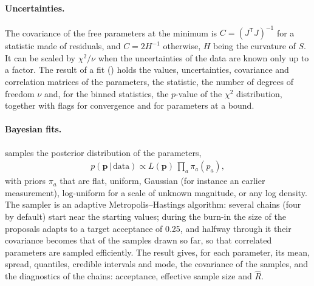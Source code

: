 \paragraph{Uncertainties.}
The covariance of the free parameters at the minimum is $C = (J^{\mathsf{T}}J)^{-1}$ for a statistic made of residuals,
and $C = 2H^{-1}$ otherwise, $H$ being the curvature of $S$. It can be scaled by $\chi^2/\nu$ when the uncertainties
of the data are known only up to a factor. The result of a fit () holds the values, uncertainties,
covariance and correlation matrices of the parameters, the statistic, the number of degrees of freedom $\nu$ and,
for the binned statistics, the $p$-value of the $\chi^2$ distribution, together with flags for convergence and for
parameters at a bound.

\paragraph{Bayesian fits.}
 samples the posterior distribution of the parameters,
\begin{align}
  p(\mathbf{p}\,|\,\text{data}) \propto L(\mathbf{p})\,\prod_a \pi_a(p_a),
\end{align}
with priors $\pi_a$ that are flat, uniform, Gaussian (for instance an earlier
measurement), log-uniform for a scale of unknown magnitude, or any log density. The sampler is an adaptive
Metropolis--Hastings algorithm: several chains (four by default) start near the starting values; during the burn-in
the size of the proposals adapts to a target acceptance of 0.25, and halfway through it their covariance becomes that
of the samples drawn so far, so that correlated parameters are sampled efficiently. The result gives, for each
parameter, its mean, spread, quantiles, credible intervals and mode, the covariance of the samples, and the
diagnostics of the chains: acceptance, effective sample size and $\hat{R}$.

